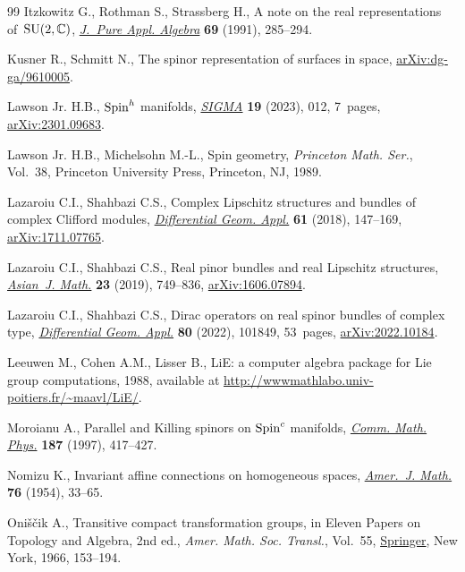 \documentclass[pdftex]{sigma}
\numberwithin{equation}{section}
\begin{document}
\begin{thebibliography}{99}
Itzkowitz G., Rothman S., Strassberg H., A note on the real representations
 of~{${\rm SU}(2,{\mathbb C})$}, \href{https://doi.org/10.1016/0022-4049(91)90023-U}{\textit{J.~Pure Appl. Algebra}} \textbf{69}
 (1991), 285--294.

Kusner R., Schmitt N., The spinor representation of surfaces in space,
 \href{https://arxiv.org/abs/dg-ga/9610005}{arXiv:dg-ga/9610005}.

Lawson Jr. H.B., {${\rm Spin}^h$} manifolds, \href{https://doi.org/10.3842/SIGMA.2023.012}{\textit{SIGMA}} \textbf{19} (2023),
 012, 7~pages, \href{https://arxiv.org/abs/2301.09683}{arXiv:2301.09683}.

Lawson Jr. H.B., Michelsohn M.-L., Spin geometry, \textit{Princeton Math. Ser.},
 Vol.~38, Princeton University Press, Princeton, NJ, 1989.

Lazaroiu C.I., Shahbazi C.S., Complex {L}ipschitz structures and bundles of
 complex {C}lifford modules, \href{https://doi.org/10.1016/j.difgeo.2018.08.006}{\textit{Differential Geom. Appl.}} \textbf{61}
 (2018), 147--169, \href{https://arxiv.org/abs/1711.07765}{arXiv:1711.07765}.

Lazaroiu C.I., Shahbazi C.S., Real pinor bundles and real {L}ipschitz
 structures, \href{https://doi.org/10.4310/AJM.2019.v23.n5.a3}{\textit{Asian~J. Math.}} \textbf{23} (2019), 749--836,
 \href{https://arxiv.org/abs/1606.07894}{arXiv:1606.07894}.

Lazaroiu C.I., Shahbazi C.S., Dirac operators on real spinor bundles of complex
 type, \href{https://doi.org/10.1016/j.difgeo.2022.101849}{\textit{Differential Geom. Appl.}} \textbf{80} (2022), 101849, 53~pages,
 \href{https://arxiv.org/abs/2022.10184}{arXiv:2022.10184}.

Leeuwen M., Cohen A.M., Lisser B., Li{E}: a computer algebra package for {L}ie
 group computations, 1988, available at
 \url{http://wwwmathlabo.univ-poitiers.fr/~maavl/LiE/}.

Moroianu A., Parallel and {K}illing spinors on {${\rm Spin}^c$} manifolds,
 \href{https://doi.org/10.1007/s002200050142}{\textit{Comm. Math. Phys.}} \textbf{187} (1997), 417--427.

Nomizu K., Invariant affine connections on homogeneous spaces, \href{https://doi.org/10.2307/2372398}{\textit{Amer.~J.
 Math.}} \textbf{76} (1954), 33--65.

Oni\v{s}\v{c}ik A., Transitive compact transformation groups, in Eleven
 {P}apers on {T}opology and {A}lgebra, 2nd ed., \textit{Amer. Math. Soc. Transl.}, Vol.~55, \href{https://doi.org/10.1090/trans2/055}{Springer}, New York, 1966, 153--194.


\end{thebibliography}
\end{document}
